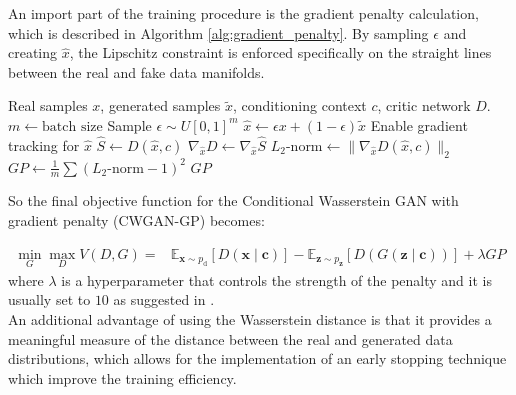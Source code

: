 An import part of the training procedure is the gradient penalty calculation, which is described in Algorithm \ref{alg:gradient_penalty}.
By sampling $\epsilon$ and creating $\hat{x}$, the Lipschitz constraint is enforced specifically on the straight lines between the real and fake data manifolds.

\begin{algorithm}[H]
\caption{Gradient Penalty Calculation for CWGAN-GP}
\label{alg:gradient_penalty}
\begin{algorithmic}[1]
\REQUIRE Real samples $x$, generated samples $\tilde{x}$, conditioning context $c$, critic network $D$.
\STATE $m \leftarrow \text{batch size}$
\STATE Sample $\epsilon \sim U[0, 1]^m$ 
\STATE $\hat{x} \leftarrow \epsilon x + (1 - \epsilon) \tilde{x}$ 
\STATE Enable gradient tracking for $\hat{x}$
\STATE $\hat{S} \leftarrow D(\hat{x}, c)$ 
\STATE $\nabla_{\hat{x}} D \leftarrow \nabla_{\hat{x}} \hat{S}$ 
\STATE $L_2 \text{-norm} \leftarrow \|\nabla_{\hat{x}} D(\hat{x}, c)\|_2$ 
\STATE $GP \leftarrow \frac{1}{m} \sum (L_2 \text{-norm} - 1)^2$ 
\RETURN $GP$
\end{algorithmic}
\end{algorithm}

So the final objective function for the Conditional Wasserstein GAN with gradient penalty (CWGAN-GP) becomes:

\begin{equation}
    \begin{aligned}
        \min _G \max _D V(D, G) = & \mathbb{E}_{\boldsymbol{x} \sim p_{\text {d}}}[D(\boldsymbol{x} \mid \boldsymbol{c})] - \mathbb{E}_{\boldsymbol{z} \sim p_{\boldsymbol{z}}}[D(G(\boldsymbol{z} \mid \boldsymbol{c}))] + \lambda GP
    \end{aligned}
\end{equation}
where $\lambda$ is a hyperparameter that controls the strength of the penalty and it is usually set to $10$ as suggested in \cite{background2:gp_wgan}.\\
An additional advantage of using the Wasserstein distance is that it provides a meaningful measure of the distance between the real and generated data distributions, which allows for the implementation of an early stopping technique which
improve the training efficiency.\\

